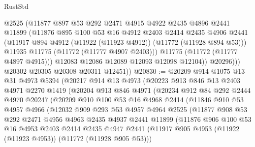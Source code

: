 \begin{lexlean}{RustStd}
\begin{coremodule}
                  @2525
                  (@11877
                    @897
                    @53
                    @292
                    @2471
                    @4915
                    @4922
                    @2435
                    @4896
                    @2441
                    @11899
                    (@11876
                      @895
                      @100
                      @53
                      @16
                      @4912
                      @2403
                      @2414
                      @2435
                      @4906
                      @2441
                      (@11917 @894 @4912 (@11922 (@11923 @4912)) (@11772 (@11928 @894 @53)))
                      @11935
                      @11775
                      (@11772 (@11777 @4907 @2403)))
                    @11775
                    (@11772 (@11777 @4897 @4915)))
                  @12083
                  @12086
                  @12089
                  @12093
                  @12098
                  @12104))
              @20296)))
        @20302
        @20305
        @20308
        @20311
        @12451))
@20830 := @20209
    @914
    @1075
    @13
    @31
    @4973
    @5394
    (@20217
      @914
      @13
      @4973
      (@20223
        @913
        @846
        @13
        @2403
        @4971
        @2270
        @1419
        (@20204
          @913
          @846
          @4971
          (@20234
            @912
            @84
            @292
            @2444
            @4970
            @20247
            (@20209
              @910
              @100
              @53
              @16
              @4968
              @2414
              (@11846
                @910
                @53
                @4957
                @4966
                (@12032
                  @909
                  @293
                  @53
                  @4957
                  @4964
                  @2525
                  (@11877
                    @908
                    @53
                    @292
                    @2471
                    @4956
                    @4963
                    @2435
                    @4937
                    @2441
                    @11899
                    (@11876
                      @906
                      @100
                      @53
                      @16
                      @4953
                      @2403
                      @2414
                      @2435
                      @4947
                      @2441
                      (@11917 @905 @4953 (@11922 (@11923 @4953)) (@11772 (@11928 @905 @53)))

\end{coremodule}
\end{lexlean}
